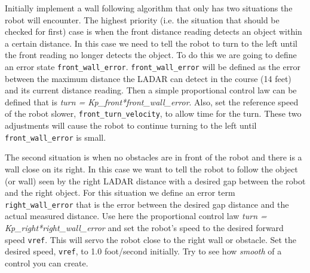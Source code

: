 \documentclass[11pt]{article}
\begin{document}
    Initially implement a wall following algorithm that only has two situations the robot will encounter. The highest priority (i.e. the situation that should be checked for first) case is when the front distance reading detects an object within a certain distance. In this case we need to tell the robot to turn to the left until the front reading no longer detects the object. To do this we are going to define an error state \texttt{front_wall_error}. \texttt{front_wall_error} will be defined as the error between the maximum distance the LADAR can detect in the course (14 feet) and its current distance reading. Then a simple proportional control law can be defined that is \textit{turn = Kp\_front*front\_wall\_error}. Also, set the reference speed of the robot slower, \texttt{front_turn_velocity}, to allow time for the turn. These two adjustments will cause the robot to continue turning to the left until \texttt{front_wall_error} is small.

    The second situation is when no obstacles are in front of the robot and there is a wall close on its right. In this case we want to tell the robot to follow the object (or wall) seen by the right LADAR distance with a desired gap between the robot and the right object. For this situation we define an error term \texttt{right_wall_error} that is the error between the desired gap distance and the actual measured distance. Use here the proportional control law \textit{turn = Kp\_right*right\_wall\_error} and set the robot’s speed to the desired forward speed \texttt{vref}. This will servo the robot close to the right wall or obstacle. Set the desired speed, \texttt{vref}, to 1.0 foot/second initially. Try to see how \textit{smooth} of a control you can create.
\end{document}
